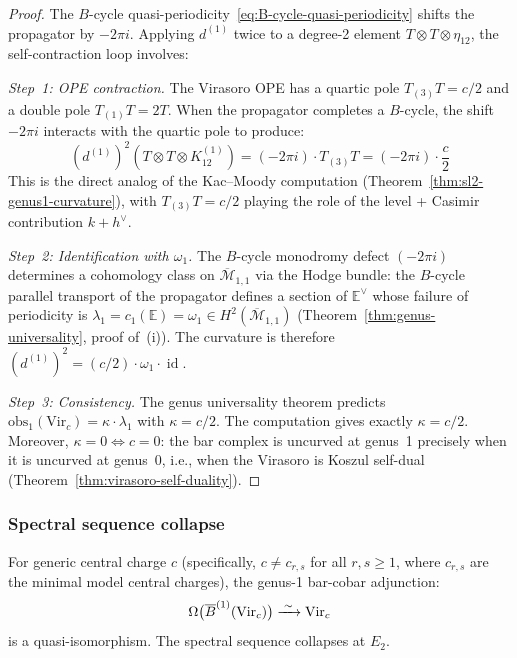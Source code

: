 \begin{proof}
The $B$-cycle quasi-periodicity~\eqref{eq:B-cycle-quasi-periodicity}
shifts the propagator by $-2\pi i$.  Applying $d^{(1)}$ twice to a
degree-2 element $T \otimes T \otimes \eta_{12}$, the self-contraction
loop involves:

\emph{Step~1: OPE contraction.}
The Virasoro OPE has a quartic pole $T_{(3)}T = c/2$ and a double pole
$T_{(1)}T = 2T$.  When the propagator completes a $B$-cycle, the
shift $-2\pi i$ interacts with the quartic pole to produce:
\begin{equation}
(d^{(1)})^2(T \otimes T \otimes K^{(1)}_{12})
= (-2\pi i) \cdot T_{(3)}T = (-2\pi i) \cdot \frac{c}{2}
\end{equation}
This is the direct analog of the Kac--Moody computation
(Theorem~\ref{thm:sl2-genus1-curvature}), with $T_{(3)}T = c/2$ playing
the role of the level + Casimir contribution $k + h^\vee$.

\emph{Step~2: Identification with $\omega_1$.}
The $B$-cycle monodromy defect $(-2\pi i)$ determines a cohomology
class on $\overline{\mathcal{M}}_{1,1}$ via the Hodge bundle: the
$B$-cycle parallel transport of the propagator defines a section of
$\mathbb{E}^\vee$ whose failure of periodicity is $\lambda_1 = c_1(\mathbb{E})
= \omega_1 \in H^2(\overline{\mathcal{M}}_{1,1})$
(Theorem~\ref{thm:genus-universality}, proof of~(i)).
The curvature is therefore
$(d^{(1)})^2 = (c/2) \cdot \omega_1 \cdot \operatorname{id}$.

\emph{Step~3: Consistency.}
The genus universality theorem predicts
$\mathrm{obs}_1(\mathrm{Vir}_c) = \kappa \cdot \lambda_1$ with
$\kappa = c/2$.  The computation gives exactly $\kappa = c/2$.
Moreover, $\kappa = 0 \iff c = 0$: the bar complex is uncurved at
genus~1 precisely when it is uncurved at genus~0, i.e., when the
Virasoro is Koszul self-dual (Theorem~\ref{thm:virasoro-self-duality}).
\end{proof}

\subsubsection{Spectral sequence collapse}

\begin{theorem}
\label{thm:vir-genus1-inversion}
For generic central charge $c$ (specifically, $c \neq c_{r,s}$ for all
$r, s \geq 1$, where $c_{r,s}$ are the minimal model central charges),
the genus-1 bar-cobar adjunction:
\begin{equation}
\Omega\bigl(\overline{B}^{(1)}(\mathrm{Vir}_c)\bigr) \xrightarrow{\;\sim\;} \mathrm{Vir}_c
\end{equation}
is a quasi-isomorphism.  The spectral sequence collapses at $E_2$.
\end{theorem}


